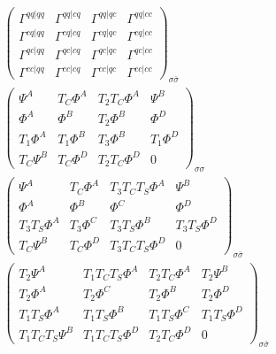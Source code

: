 \documentclass[10pt]{scrartcl}
\newcommand{\sss}{_{\sigma \sigma}}
\newcommand{\ssb}{_{\sigma \bar{\sigma}}}
\begin{document}
\begin{align}
\left( 
\begin{matrix}
\Gamma^{qq|qq} & \Gamma^{qq|cq} & \Gamma^{qq|qc} & \Gamma^{qq|cc} \\
\Gamma^{cq|qq} & \Gamma^{cq|cq} & \Gamma^{cq|qc} & \Gamma^{cq|cc} \\
\Gamma^{qc|qq} & \Gamma^{qc|cq} & \Gamma^{qc|qc} & \Gamma^{qc|cc} \\
\Gamma^{cc|qq} & \Gamma^{cc|cq} & \Gamma^{cc|qc} & \Gamma^{cc|cc} 
\end{matrix}
\right) \ssb
\nonumber \\
\left( 
\begin{matrix}
\Psi^A & T_C \Phi^A & T_2 T_C \Phi^A & \Psi^B \\
\Phi^A & \Phi^B & T_2 \Phi^B & \Phi^D \\
T_1 \Phi^A & T_1 \Phi^B & T_3 \Phi^B & T_1 \Phi^D \\
T_C \Psi^B & T_C \Phi^D & T_2 T_C \Phi^D & 0
\end{matrix}
\right) \sss
\nonumber \\
\left( 
\begin{matrix}
\Psi^A & T_C \Phi^A & T_3 T_C T_S \Phi^A & \Psi^B \\
\Phi^A & \Phi^B & \Phi^C & \Phi^D \\
T_3 T_S \Phi^A & T_3 \Phi^C & T_3 T_S \Phi^B & T_3 T_S \Phi^D \\
T_C \Psi^B & T_C \Phi^D & T_3 T_C T_S \Phi^D & 0
\end{matrix}
\right) \ssb
\nonumber \\
\left( 
\begin{matrix}
T_2 \Psi^A & T_1 T_C T_S \Phi^A & T_2 T_C \Phi^A & T_2 \Psi^B \\
T_2 \Phi^A & T_2 \Phi^C & T_2 \Phi^B & T_2 \Phi^D \\
T_1 T_S \Phi^A & T_1 T_S \Phi^B & T_1 T_S \Phi^C & T_1 T_S \Phi^D \\
T_1 T_C T_S \Psi^B & T_1 T_C T_S \Phi^D & T_2 T_C \Phi^D & 0
\end{matrix}
\right) \ssb
\end{align}


\newpage
\end{document}
